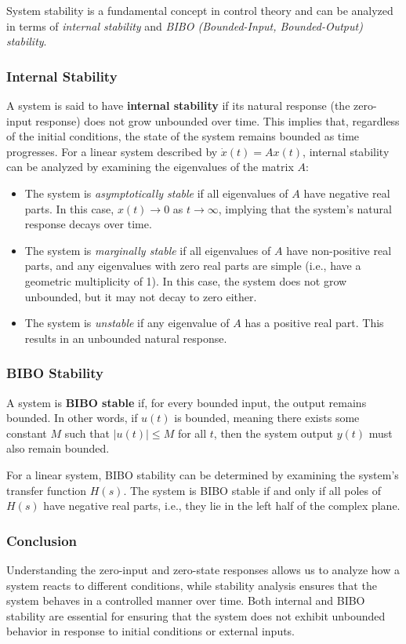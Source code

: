 System stability is a fundamental concept in control theory and can be analyzed in terms of \textit{internal stability} and \textit{BIBO (Bounded-Input, Bounded-Output) stability}.

\subsubsection{Internal Stability}
A system is said to have \textbf{internal stability} if its natural response (the zero-input response) does not grow unbounded over time. This implies that, regardless of the initial conditions, the state of the system remains bounded as time progresses. For a linear system described by \( \dot{x}(t) = A x(t) \), internal stability can be analyzed by examining the eigenvalues of the matrix \(A\):

\begin{itemize}
    \item The system is \textit{asymptotically stable} if all eigenvalues of \(A\) have negative real parts. In this case, \( x(t) \to 0 \) as \( t \to \infty \), implying that the system's natural response decays over time.
    \item The system is \textit{marginally stable} if all eigenvalues of \(A\) have non-positive real parts, and any eigenvalues with zero real parts are simple (i.e., have a geometric multiplicity of 1). In this case, the system does not grow unbounded, but it may not decay to zero either.
    \item The system is \textit{unstable} if any eigenvalue of \(A\) has a positive real part. This results in an unbounded natural response.
\end{itemize}


\subsubsection{BIBO Stability}
A system is \textbf{BIBO stable} if, for every bounded input, the output remains bounded. In other words, if \( u(t) \) is bounded, meaning there exists some constant \( M \) such that \( |u(t)| \leq M \) for all \( t \), then the system output \( y(t) \) must also remain bounded.

For a linear system, BIBO stability can be determined by examining the system's transfer function \( H(s) \). The system is BIBO stable if and only if all poles of \( H(s) \) have negative real parts, i.e., they lie in the left half of the complex plane.

\subsubsection{Conclusion}
Understanding the zero-input and zero-state responses allows us to analyze how a system reacts to different conditions, while stability analysis ensures that the system behaves in a controlled manner over time. Both internal and BIBO stability are essential for ensuring that the system does not exhibit unbounded behavior in response to initial conditions or external inputs.


